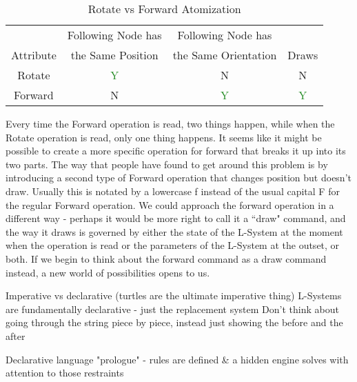 \documentclass[12pt,twoside]{reedthesis}
\begin{document}
\begin{longtable}{|c||c|c|c|}
	 	\caption[Rotate vs Forward Atomization]{Rotate vs Forward Atomization}\\ \hline
		    	      & Following Node has & Following Node has &  \\  
		   Attribute & the Same Position &  the Same Orientation & Draws \\\hline%
		  \endfirsthead
		    \endhead

	    Rotate & \textcolor{ForestGreen}{Y} & \textcolor{WildStrawberry}{N} & \textcolor{WildStrawberry}{N}  \\\hline
	    Forward & \textcolor{WildStrawberry}{N} & \textcolor{ForestGreen}{Y} & \textcolor{ForestGreen}{Y}  \\\hline

\end{longtable}

Every time the Forward operation is read, two things happen, while when the Rotate operation is read, only one thing happens. It seems like it might be possible to create a more specific operation for forward that breaks it up into its two parts. The way that people have found to get around this problem is by introducing a second type of Forward operation that changes position but doesn't draw. Usually this is notated by a lowercase f instead of the usual capital F for the regular Forward operation. We could approach the forward operation in a different way - perhaps it would be more right to call it a ``draw" command, and the way it draws is governed by either the state of the L-System at the moment when the operation is read or the parameters of the L-System at the outset, or both. If we begin to think about the forward command as a draw command instead, a new world of possibilities opens to us.

Imperative vs declarative (turtles are the ultimate imperative thing) 
L-Systems are fundamentally declarative - just the replacement system
Don't think about going through the string piece by piece, instead just showing the before and the after

Declarative language "prologue" - rules are defined & a hidden engine solves with attention to those restraints
\end{document}
